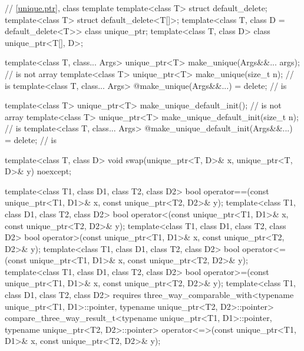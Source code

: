 \begin{codeblock}
{  // \ref{unique.ptr}, class template 
  template<class T> struct default_delete;
  template<class T> struct default_delete<T[]>;
  template<class T, class D = default_delete<T>> class unique_ptr;
  template<class T, class D> class unique_ptr<T[], D>;

  template<class T, class... Args>
    unique_ptr<T> make_unique(Args&&... args);                                  //  is not array
  template<class T>
    unique_ptr<T> make_unique(size_t n);                                        //  is 
  template<class T, class... Args>
    @\unspecnc@ make_unique(Args&&...) = delete;                                //  is 

  template<class T>
    unique_ptr<T> make_unique_default_init();                                   //  is not array
  template<class T>
    unique_ptr<T> make_unique_default_init(size_t n);                           //  is 
  template<class T, class... Args>
    @\unspecnc@ make_unique_default_init(Args&&...) = delete;                   //  is 

  template<class T, class D>
    void swap(unique_ptr<T, D>& x, unique_ptr<T, D>& y) noexcept;

  template<class T1, class D1, class T2, class D2>
    bool operator==(const unique_ptr<T1, D1>& x, const unique_ptr<T2, D2>& y);
  template<class T1, class D1, class T2, class D2>
    bool operator<(const unique_ptr<T1, D1>& x, const unique_ptr<T2, D2>& y);
  template<class T1, class D1, class T2, class D2>
    bool operator>(const unique_ptr<T1, D1>& x, const unique_ptr<T2, D2>& y);
  template<class T1, class D1, class T2, class D2>
    bool operator<=(const unique_ptr<T1, D1>& x, const unique_ptr<T2, D2>& y);
  template<class T1, class D1, class T2, class D2>
    bool operator>=(const unique_ptr<T1, D1>& x, const unique_ptr<T2, D2>& y);
  template<class T1, class D1, class T2, class D2>
    requires three_way_comparable_with<typename unique_ptr<T1, D1>::pointer,
                                       typename unique_ptr<T2, D2>::pointer>
    compare_three_way_result_t<typename unique_ptr<T1, D1>::pointer,
                               typename unique_ptr<T2, D2>::pointer>
      operator<=>(const unique_ptr<T1, D1>& x, const unique_ptr<T2, D2>& y);

}
\end{codeblock}
